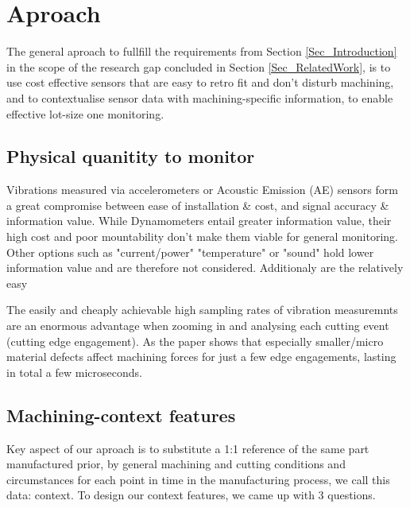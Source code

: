 \documentclass[5p,times,procedia]{elsarticle}
\begin{document}
\section{Aproach}\label{Sec_Aproach}
The general aproach to fullfill the requirements from Section \ref{Sec_Introduction} in the scope of the research gap concluded in Section \ref{Sec_RelatedWork}, is to use cost effective sensors that are easy to retro fit and don't disturb machining, and to contextualise sensor data with machining-specific information, to enable effective lot-size one monitoring.


\subsection{Physical quanitity to monitor}
\vspace*{-\baselineskip}
Vibrations measured via accelerometers or Acoustic Emission (AE) sensors form a great compromise between ease of installation \& cost, and signal accuracy \& information value. While Dynamometers entail greater information value, their high cost and poor mountability don't make them viable for general monitoring. Other options such as "current/power" "temperature" or "sound" hold lower information value and are therefore not considered.
Additionaly are the relatively easy 

The easily and cheaply achievable high sampling rates of vibration measuremnts are an enormous advantage when zooming in and analysing each cutting event (cutting edge engagement). As the paper \cite{Pfirrmann.Baumann.ea2021} shows that especially smaller/micro material defects affect machining forces for just a few edge engagements, lasting in total a few microseconds.

\subsection{Machining-context features}
\vspace*{-\baselineskip}

Key aspect of our aproach is to substitute a 1:1 reference of the same part manufactured prior, by general machining and cutting conditions and circumstances for each point in time in the manufacturing process, we call this data: context.
To design our context features, we came up with 3 questions.
\end{document}
